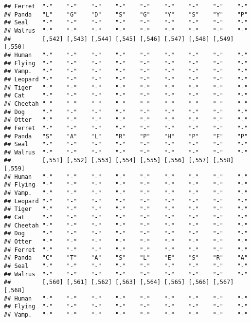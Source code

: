 \documentclass[]{article}
\begin{document}
\begin{verbatim}
## Ferret  "-"    "-"    "-"    "-"    "-"    "-"    "-"    "-"    "-"   
## Panda   "L"    "G"    "D"    "S"    "G"    "Y"    "S"    "Y"    "P"   
## Seal    "-"    "-"    "-"    "-"    "-"    "-"    "-"    "-"    "-"   
## Walrus  "-"    "-"    "-"    "-"    "-"    "-"    "-"    "-"    "-"   
##         [,542] [,543] [,544] [,545] [,546] [,547] [,548] [,549] [,550]
## Human   "-"    "-"    "-"    "-"    "-"    "-"    "-"    "-"    "-"   
## Flying  "-"    "-"    "-"    "-"    "-"    "-"    "-"    "-"    "-"   
## Vamp.   "-"    "-"    "-"    "-"    "-"    "-"    "-"    "-"    "-"   
## Leopard "-"    "-"    "-"    "-"    "-"    "-"    "-"    "-"    "-"   
## Tiger   "-"    "-"    "-"    "-"    "-"    "-"    "-"    "-"    "-"   
## Cat     "-"    "-"    "-"    "-"    "-"    "-"    "-"    "-"    "-"   
## Cheetah "-"    "-"    "-"    "-"    "-"    "-"    "-"    "-"    "-"   
## Dog     "-"    "-"    "-"    "-"    "-"    "-"    "-"    "-"    "-"   
## Otter   "-"    "-"    "-"    "-"    "-"    "-"    "-"    "-"    "-"   
## Ferret  "-"    "-"    "-"    "-"    "-"    "-"    "-"    "-"    "-"   
## Panda   "S"    "A"    "L"    "R"    "P"    "H"    "P"    "F"    "P"   
## Seal    "-"    "-"    "-"    "-"    "-"    "-"    "-"    "-"    "-"   
## Walrus  "-"    "-"    "-"    "-"    "-"    "-"    "-"    "-"    "-"   
##         [,551] [,552] [,553] [,554] [,555] [,556] [,557] [,558] [,559]
## Human   "-"    "-"    "-"    "-"    "-"    "-"    "-"    "-"    "-"   
## Flying  "-"    "-"    "-"    "-"    "-"    "-"    "-"    "-"    "-"   
## Vamp.   "-"    "-"    "-"    "-"    "-"    "-"    "-"    "-"    "-"   
## Leopard "-"    "-"    "-"    "-"    "-"    "-"    "-"    "-"    "-"   
## Tiger   "-"    "-"    "-"    "-"    "-"    "-"    "-"    "-"    "-"   
## Cat     "-"    "-"    "-"    "-"    "-"    "-"    "-"    "-"    "-"   
## Cheetah "-"    "-"    "-"    "-"    "-"    "-"    "-"    "-"    "-"   
## Dog     "-"    "-"    "-"    "-"    "-"    "-"    "-"    "-"    "-"   
## Otter   "-"    "-"    "-"    "-"    "-"    "-"    "-"    "-"    "-"   
## Ferret  "-"    "-"    "-"    "-"    "-"    "-"    "-"    "-"    "-"   
## Panda   "C"    "T"    "A"    "S"    "L"    "E"    "S"    "R"    "A"   
## Seal    "-"    "-"    "-"    "-"    "-"    "-"    "-"    "-"    "-"   
## Walrus  "-"    "-"    "-"    "-"    "-"    "-"    "-"    "-"    "-"   
##         [,560] [,561] [,562] [,563] [,564] [,565] [,566] [,567] [,568]
## Human   "-"    "-"    "-"    "-"    "-"    "-"    "-"    "-"    "-"   
## Flying  "-"    "-"    "-"    "-"    "-"    "-"    "-"    "-"    "-"   
## Vamp.   "-"    "-"    "-"    "-"    "-"    "-"    "-"    "-"    "-"   

\end{verbatim}
\end{document}
